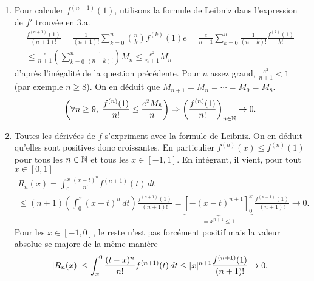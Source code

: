 \begin{enumerate}
 \item Pour calculer $f^{(n+1)}(1)$, utilisons la formule de Leibniz dans l'expression de $f'$ trouvée en 3.a.
\begin{multline*}
  \frac{f^{(n+1)}(1)}{(n+1)!} = \frac{1}{(n+1)!}\sum_{k=0}^n\binom{n}{k}f^{(k)}(1)e
 = \frac{e}{n+1}\sum_{k=0}^n\frac{1}{(n-k)!} \frac{f^{(k)}(1)}{k!} \\
 \leq \frac{e}{n+1} \left( \sum_{k=0}^n\frac{1}{(n-k)!}\right)  M_n \leq \frac{e^2}{n+1} M_n
\end{multline*}
d'après l'inégalité de la question précédente.\newline
Pour $n$ assez grand, $\frac{e^2}{n+1} < 1$ (par exemple $n\geq 8$). On en déduit que $M_{n+1} = M_n = \cdots = M_9 = M_8$. 
\[
 \left( \forall n \geq 9, \; \frac{f^{(n)}(1)}{n!} \leq \frac{e^2 M_8}{n}\right) \Rightarrow \left( \frac{f^{(n)}(1)}{n!} \right)_{n \in \mathbb{N}} \rightarrow 0.
\]

 
 \item Toutes les dérivées de $f$ s'expriment avec la formule de Leibniz. On en déduit qu'elles sont positives donc croissantes. En particulier $f^{(n)}(x) \leq f^{(n)}(1)$ pour tous les $n\in \mathbb{N}$ et tous les $x \in \left[ -1,1\right]$. En intégrant, il vient, pour tout $x \in \left[ 0,1\right]$ 
\begin{multline*}
 R_n(x) = \int_0^x\frac{(x-t)^n}{n!}f^{(n+1)}(t)\,dt \\
  \leq (n+1)\left( \int_0^x(x-t)^n\,dt\right) \frac{f^{(n+1)}(1)}{(n+1)!}
  = \underset{ = x^{n+1} \leq 1}{\underbrace{\left[ -(x-t)^{n+1}\right]_{0}^{x}}} \,\frac{f^{(n+1)}(1)}{(n+1)!} \rightarrow 0.
\end{multline*}
Pour les $x\in \left[ -1,0\right]$, le reste n'est pas forcément positif mais la valeur absolue se majore de la même manière
\[
 \left|R_n(x)\right| \leq \int_{x}^{0} \frac{(t-x)^n}{n!} f^{(n+ 1)}(t)\,dt \\
 \leq |x|^{n+1}\frac{f^{(n+1)}(1)}{(n+1)!} \rightarrow 0.
\]

 \end{enumerate}

